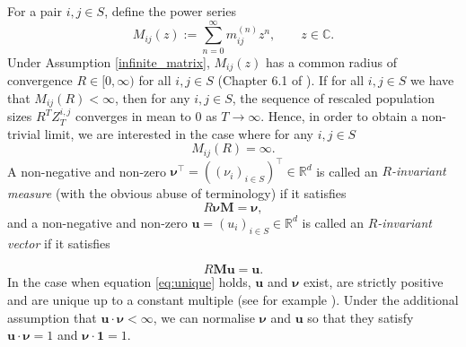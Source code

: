 \documentclass[preprint,3p,12pt]{elsarticle}
\theoremstyle{definition}
\begin{document}
For a pair $i,j \in S$, define the power series
\begin{equation*}
    M_{ij}(z) := \sum_{n=0}^{\infty} m_{ij}^{(n)} z^n, \qquad z \in \mathbb{C}.
\end{equation*}
Under Assumption \ref{infinite_matrix}, $M_{ij}(z)$ has a common radius of convergence $R \in [0, \infty)$ for all $i,j \in S$ (Chapter 6.1 of \cite{seneta}). If for all $i, j \in S$ we have that $M_{ij}(R) < \infty$, then for any $i,j \in S$, the sequence of rescaled population sizes $R^T Z_T^{i, j}$ converges in mean to 0 as $T \to \infty$. Hence, in order to obtain a non-trivial limit, we are interested in the case where for any $i,j \in S$
\begin{equation}
    M_{ij}(R) = \infty. \label{eq:unique}
\end{equation}
A non-negative and non-zero $\boldsymbol{\nu}^{\top}=((\nu_i)_{i \in S})^{\top} \in \mathbb{R}^{d}$ is called an \textit{$R$-invariant measure} (with the obvious abuse of terminology) if it satisfies
\begin{equation*}
    R \boldsymbol{\nu} \boldsymbol{M} = \boldsymbol{\nu},
\end{equation*}
and a non-negative and non-zero $\boldsymbol{u}=(u_i)_{i \in S} \in \mathbb{R}^{d}$ is called an \textit{$R$-invariant vector} if it satisfies

\begin{equation*}
    R \boldsymbol{M} \boldsymbol{u} = \boldsymbol{u}.
\end{equation*}
In the case when equation \eqref{eq:unique} holds, $\boldsymbol{u}$ and $\boldsymbol{\nu}$ exist, are strictly positive and are unique up to a constant multiple (see for example \cite{moy1967}). Under the additional assumption that $\boldsymbol{u}\cdot \boldsymbol{\nu} < \infty$, we can normalise $\boldsymbol{\nu}$ and $\boldsymbol{u}$ so that they satisfy $ \boldsymbol{u} \cdot\boldsymbol{\nu} = 1$ and $\boldsymbol{\nu} \cdot \boldsymbol{1}=1$.
\end{document}
